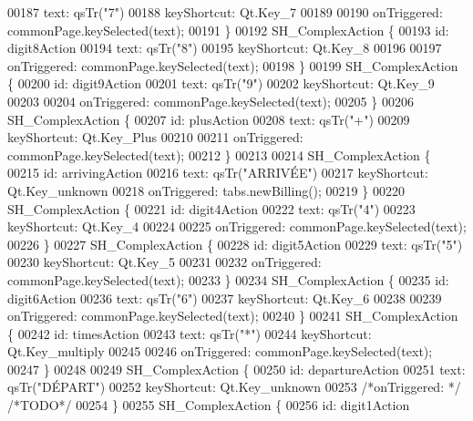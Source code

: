 \begin{DoxyCode}
00187         text: qsTr(\textcolor{stringliteral}{"7"})
00188         keyShortcut: Qt.Key\_7
00189 
00190         onTriggered: commonPage.keySelected(text);
00191     \}
00192     SH\_ComplexAction \{
00193         \textcolor{keywordtype}{id}: digit8Action
00194         text: qsTr(\textcolor{stringliteral}{"8"})
00195         keyShortcut: Qt.Key\_8
00196 
00197         onTriggered: commonPage.keySelected(text);
00198     \}
00199     SH\_ComplexAction \{
00200         \textcolor{keywordtype}{id}: digit9Action
00201         text: qsTr(\textcolor{stringliteral}{"9"})
00202         keyShortcut: Qt.Key\_9
00203 
00204         onTriggered: commonPage.keySelected(text);
00205     \}
00206     SH\_ComplexAction \{
00207         \textcolor{keywordtype}{id}: plusAction
00208         text: qsTr(\textcolor{stringliteral}{"+"})
00209         keyShortcut: Qt.Key\_Plus
00210 
00211         onTriggered: commonPage.keySelected(text);
00212     \}
00213 
00214     SH\_ComplexAction \{
00215         \textcolor{keywordtype}{id}: arrivingAction
00216         text: qsTr(\textcolor{stringliteral}{"ARRIVÉE"})
00217         keyShortcut: Qt.Key\_unknown
00218         onTriggered: tabs.newBilling();
00219     \}
00220     SH\_ComplexAction \{
00221         \textcolor{keywordtype}{id}: digit4Action
00222         text: qsTr(\textcolor{stringliteral}{"4"})
00223         keyShortcut: Qt.Key\_4
00224 
00225         onTriggered: commonPage.keySelected(text);
00226     \}
00227     SH\_ComplexAction \{
00228         \textcolor{keywordtype}{id}: digit5Action
00229         text: qsTr(\textcolor{stringliteral}{"5"})
00230         keyShortcut: Qt.Key\_5
00231 
00232         onTriggered: commonPage.keySelected(text);
00233     \}
00234     SH\_ComplexAction \{
00235         \textcolor{keywordtype}{id}: digit6Action
00236         text: qsTr(\textcolor{stringliteral}{"6"})
00237         keyShortcut: Qt.Key\_6
00238 
00239         onTriggered: commonPage.keySelected(text);
00240     \}
00241     SH\_ComplexAction \{
00242         \textcolor{keywordtype}{id}: timesAction
00243         text: qsTr(\textcolor{stringliteral}{"*"})
00244         keyShortcut: Qt.Key\_multiply
00245 
00246         onTriggered: commonPage.keySelected(text);
00247     \}
00248 
00249     SH\_ComplexAction \{
00250         \textcolor{keywordtype}{id}: departureAction
00251         text: qsTr(\textcolor{stringliteral}{"DÉPART"})
00252         keyShortcut: Qt.Key\_unknown
00253         \textcolor{comment}{/*onTriggered: */} \textcolor{comment}{/*TODO*/}
00254     \}
00255     SH\_ComplexAction \{
00256         \textcolor{keywordtype}{id}: digit1Action

\end{DoxyCode}
